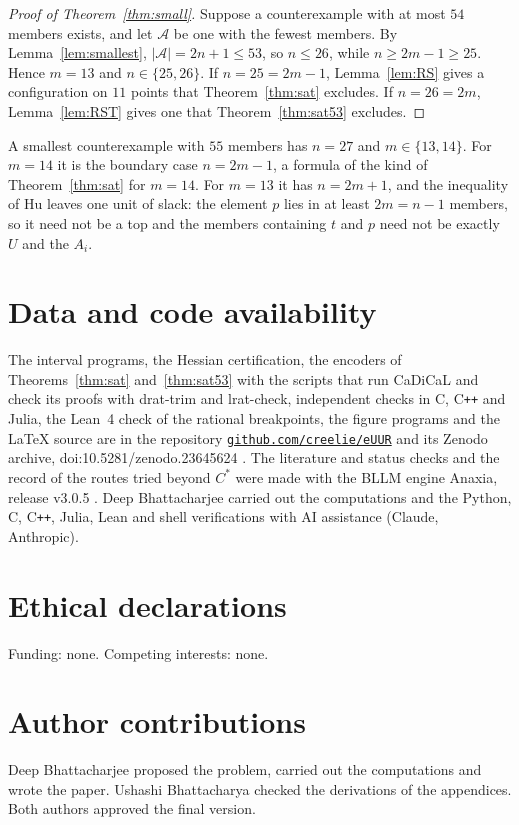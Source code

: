 \documentclass[12pt]{article}
\theoremstyle{plain}
\newcommand{\cA}{\mathcal{A}}
\newcommand{\Cs}{C^{*}}
\newcommand{\codeDOI}{\href{https://github.com/creelie/eUUR}{\nolinkurl{github.com/creelie/eUUR}}}
\begin{document}
\begin{proof}[Proof of Theorem~\ref{thm:small}]
Suppose a counterexample with at most $54$ members exists, and let $\cA$ be one with the fewest members. By Lemma~\ref{lem:smallest}, $|\cA|=2n+1\le 53$, so $n\le 26$, while $n\ge 2m-1\ge 25$. Hence $m=13$ and $n\in\{25,26\}$. If $n=25=2m-1$, Lemma~\ref{lem:RS} gives a configuration on $11$ points that Theorem~\ref{thm:sat} excludes. If $n=26=2m$, Lemma~\ref{lem:RST} gives one that Theorem~\ref{thm:sat53} excludes.
\end{proof}

\begin{remark}\label{rem:fiftyfive}
A smallest counterexample with $55$ members has $n=27$ and $m\in\{13,14\}$. For $m=14$ it is the boundary case $n=2m-1$, a formula of the kind of Theorem~\ref{thm:sat} for $m=14$. For $m=13$ it has $n=2m+1$, and the inequality of Hu leaves one unit of slack: the element $p$ lies in at least $2m=n-1$ members, so it need not be a top and the members containing $t$ and $p$ need not be exactly $U$ and the $A_i$.
\end{remark}

\section*{Data and code availability}
The interval programs, the Hessian certification, the encoders of Theorems~\ref{thm:sat} and~\ref{thm:sat53} with the scripts that run CaDiCaL and check its proofs with drat-trim and lrat-check, independent checks in C, C\texttt{++} and Julia, the Lean~4 check of the rational breakpoints, the figure programs and the \LaTeX{} source are in the repository \codeDOI{} and its Zenodo archive, doi:10.5281/zenodo.23645624 \cite{BB26z}. The literature and status checks and the record of the routes tried beyond $\Cs$ were made with the BLLM engine Anaxia, release v3.0.5 \cite{Ana26}. Deep Bhattacharjee carried out the computations and the Python, C, C\texttt{++}, Julia, Lean and shell verifications with AI assistance (Claude, Anthropic).

\section*{Ethical declarations}
Funding: none. Competing interests: none.

\section*{Author contributions}
Deep Bhattacharjee proposed the problem, carried out the computations and wrote the paper. Ushashi Bhattacharya checked the derivations of the appendices. Both authors approved the final version.
\end{document}
